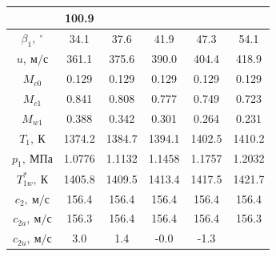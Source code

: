 \documentclass[a4paper,12pt]{article}
\begin{document}
\begin{longtable}{
    |
%    
    c|
%    
    c|
%    
    c|
%    
    c|
%    
    c|
%    
    c|
%    
    }
%        
        & 100.9
%        
        \\
        \hline
%        
        $\beta_1,\ ^\circ$
%        
        & 34.1
%        
        & 37.6
%        
        & 41.9
%        
        & 47.3
%        
        & 54.1
%        
        \\
        \hline
%        
        $u,\ м/с$
%        
        & 361.1
%        
        & 375.6
%        
        & 390.0
%        
        & 404.4
%        
        & 418.9
%        
        \\
        \hline
%        
        $M_{c0}$
%        
        & 0.129
%        
        & 0.129
%        
        & 0.129
%        
        & 0.129
%        
        & 0.129
%        
        \\
        \hline
%        
        $M_{c1}$
%        
        & 0.841
%        
        & 0.808
%        
        & 0.777
%        
        & 0.749
%        
        & 0.723
%        
        \\
        \hline
%        
        $M_{w1}$
%        
        & 0.388
%        
        & 0.342
%        
        & 0.301
%        
        & 0.264
%        
        & 0.231
%        
        \\
        \hline
%        
        $T_1,\ К$
%        
        & 1374.2
%        
        & 1384.7
%        
        & 1394.1
%        
        & 1402.5
%        
        & 1410.2
%        
        \\
        \hline
%        
        $p_1,\ МПа$
%        
        & 1.0776
%        
        & 1.1132
%        
        & 1.1458
%        
        & 1.1757
%        
        & 1.2032
%        
        \\
        \hline
%        
        $T_{1w}^*,\ К$
%        
        & 1405.8
%        
        & 1409.5
%        
        & 1413.4
%        
        & 1417.5
%        
        & 1421.7
%        
        \\
        \hline
%        
        $c_2,\ м/с$
%        
        & 156.4
%        
        & 156.4
%        
        & 156.4
%        
        & 156.4
%        
        & 156.4
%        
        \\
        \hline
%        
        $c_{2a},\ м/с$
%        
        & 156.3
%        
        & 156.4
%        
        & 156.4
%        
        & 156.4
%        
        & 156.3
%        
        \\
        \hline
%        
        $c_{2u},\ м/с$
%        
        & 3.0
%        
        & 1.4
%        
        & -0.0
%        
        & -1.3

\end{longtable}
\end{document}
